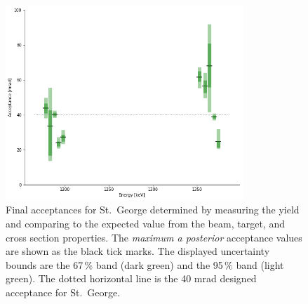 \begin{figure}
    \begin{center}
        \label{fig:final-acceptance}
        \centerline{
            \includegraphics[width=0.8\textwidth]{figures/acceptance_uncertainty.png}}
        \caption[Final acceptances]{Final acceptances for St.\ George
            determined by measuring the \alpa{} yield and comparing to
            the expected value from the beam, target, and cross section
            properties. The \textit{maximum a posterior} acceptance values
            are shown as the black tick marks. The displayed uncertainty bounds are the 67\,\%
            band (dark green) and the 95\,\% band (light green). The
            dotted horizontal line is the 40 mrad designed acceptance
            for St.\ George.}
    \end{center}
\end{figure}

